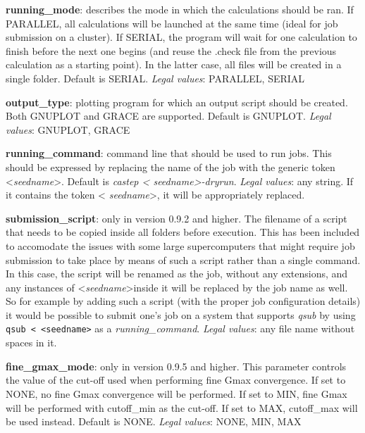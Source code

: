 \documentclass[10pt]{article}
\begin{document}
\textbf{running\_mode}: describes the mode in which the calculations should be 
ran. If PARALLEL, all calculations will be launched at the same time (ideal for 
job submission on a cluster). If SERIAL, the program will wait for one 
calculation to finish before the next one begins (and reuse the .check file from 
the previous calculation as a starting point). In the latter case, all files 
will be created in a single folder. Default is SERIAL.\newline
\textit{Legal values}: PARALLEL, SERIAL\newline

\textbf{output\_type}: plotting program for which an output script should be 
created. Both GNUPLOT and GRACE are supported. Default is GNUPLOT.\newline
\textit{Legal values}: GNUPLOT, GRACE\newline

\textbf{running\_command}: command line that should be used to run jobs. This 
should be expressed by replacing the name of the job with the generic token 
\textless \textit{seedname}\textgreater. Default is \textit{castep \textless 
seedname\textgreater -dryrun}.\newline
\textit{Legal values}: any string. If it contains the token \textless 
\textit{seedname}\textgreater, it will be appropriately replaced.\newline

\textbf{submission\_script}: only in version 0.9.2 and higher. The filename of a 
script that needs to be copied inside all folders before execution. This has 
been included to accomodate the issues with some large supercomputers that might 
require job submission to take place by means of such a script rather than a 
single command. In this case, the script will be renamed as the job, without any 
extensions, and any instances of \textless \textit{seedname}\textgreater inside 
it will be replaced by the job name as well. So for example by adding such a 
script (with the proper job configuration details) it would be possible to 
submit one's job on a system that supports \textit{qsub} by using \texttt{qsub 
\textless~\textless seedname\textgreater} as a 
\textit{running\_command}.\newline
\textit{Legal values}: any file name without spaces in it.

\textbf{fine\_gmax\_mode}: only in version 0.9.5 and higher. This parameter controls the value of the cut-off used when performing
fine Gmax convergence. If set to NONE, no fine Gmax convergence will be performed. If set to MIN, fine Gmax will be performed
with cutoff\_min as the cut-off. If set to MAX, cutoff\_max will be used instead. Default is NONE.
\newline
\textit{Legal values}: NONE, MIN, MAX
\end{document}
